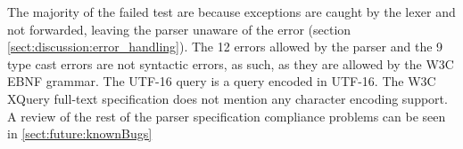 The majority of the failed test are because exceptions are caught by the lexer
and not forwarded, leaving the parser unaware of the error (section
\ref{sect:discussion:error_handling}). The 12 errors allowed by the parser and
the 9 type cast errors are not syntactic errors, as such, as they are allowed
by the W3C EBNF grammar. The UTF-16 query is a query encoded in UTF-16. The W3C XQuery full-text specification does not mention any character encoding support. A review of the rest of the parser specification compliance problems can be seen in \ref{sect:future:knownBugs} 
